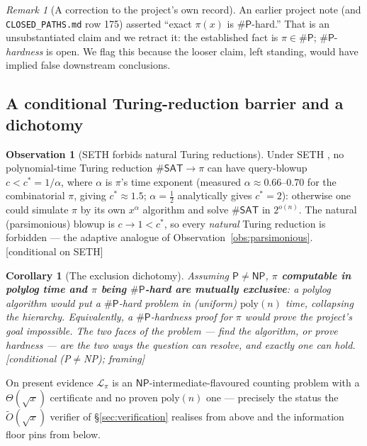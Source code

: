 \documentclass[11pt]{article}
\theoremstyle{plain}
\newtheorem{corollary}[theorem]{Corollary}
\theoremstyle{definition}
\newtheorem{observation}[theorem]{Observation}
\theoremstyle{remark}
\newtheorem{remark}[theorem]{Remark}
\newcommand{\stat}[1]{\quad\textnormal{\footnotesize\textsf{[\textcolor{accent}{#1}]}}}
\newcommand{\Otil}{\widetilde{O}}
\newcommand{\Lpi}{\mathcal{L}_{\pi}}
\newcommand{\NP}{\mathsf{NP}}
\newcommand{\sharpP}{\#\mathsf{P}}
\begin{document}
\begin{remark}[A correction to the project's own record]
An earlier project note (and \texttt{CLOSED\_PATHS.md} row 175) asserted ``exact
$\pi(x)$ is $\sharpP$-hard.'' That is an unsubstantiated claim and we retract it:
the established fact is $\pi\in\sharpP$; $\sharpP$-\emph{hardness} is open. We flag
this because the looser claim, left standing, would have implied false downstream
conclusions.
\end{remark}

\subsection{A conditional Turing-reduction barrier and a dichotomy}

\begin{observation}[SETH forbids natural Turing reductions]
\label{obs:seth}
Under SETH \cite{impagliazzopaturi2001}, no polynomial-time Turing reduction
$\#\mathsf{SAT}\to\pi$ can have query-blowup $c<c^\ast=1/\alpha$, where $\alpha$ is
$\pi$'s time exponent (measured $\alpha\approx0.66$--$0.70$ for the combinatorial
$\pi$, giving $c^\ast\approx1.5$; $\alpha=\tfrac12$ analytically gives $c^\ast=2$):
otherwise one could simulate $\pi$ by its own $x^\alpha$ algorithm and solve
$\#\mathsf{SAT}$ in $2^{o(n)}$. The natural (parsimonious) blowup is $c\to1<c^\ast$,
so every \emph{natural} Turing reduction is forbidden --- the adaptive analogue of
Observation~\ref{obs:parsimonious}.
\stat{conditional on SETH}
\end{observation}

\begin{corollary}[The exclusion dichotomy]
\label{cor:dichotomy}
Assuming $\mathsf{P}\ne\NP$, \textbf{$\pi$ computable in polylog time and $\pi$
being $\sharpP$-hard are mutually exclusive}: a polylog algorithm would put a
$\sharpP$-hard problem in (uniform) $\mathrm{poly}(n)$ time, collapsing the
hierarchy. Equivalently, \emph{a $\sharpP$-hardness proof for $\pi$ would prove the
project's goal impossible.} The two faces of the problem --- find the algorithm,
or prove hardness --- are the two ways the question can resolve, and exactly one
can hold.
\stat{conditional (P$\ne$NP); framing}
\end{corollary}

On present evidence $\Lpi$ is an $\NP$-intermediate-flavoured counting problem with
a $\Theta(\sqrt{x})$ certificate and no proven $\mathrm{poly}(n)$ one --- precisely
the status the $\Otil(\sqrt{x})$ verifier of \S\ref{sec:verification} realises from
above and the information floor pins from below.
\end{document}
